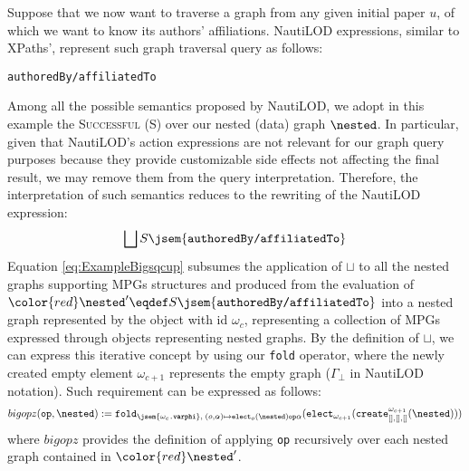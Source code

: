 \begin{example}
Suppose that we now want to traverse a graph from any given initial paper $u$, of which we want to know its authors' affiliations. NautiLOD expressions, similar to XPaths', represent such graph traversal query as follows:
\begin{center}
\texttt{authoredBy/affiliatedTo}
\end{center}
Among all the possible semantics proposed by NautiLOD, we adopt in this example the \textsc{Successful} (S) over our nested (data) graph $\nested$. In particular, given that NautiLOD's action expressions are not relevant for our graph query purposes because they provide customizable side effects not affecting the final result, we may remove them from the query interpretation. Therefore, the interpretation of such semantics reduces to the rewriting of the NautiLOD expression: \begin{equation}\label{eq:ExampleBigsqcup}
\bigsqcup S\jsem{\texttt{authoredBy/affiliatedTo}}
\end{equation}
Equation \ref{eq:ExampleBigsqcup} subsumes the application of $\sqcup$ to all the nested graphs supporting MPGs structures and produced from the evaluation of ${\color{red}\nested'\eqdef S\jsem{\texttt{authoredBy/affiliatedTo}}}$ into a nested graph represented by the object with id $\omega_c$, representing a collection of MPGs expressed through objects representing nested graphs. By the definition of $\sqcup$, we can express this iterative concept by using our \texttt{fold} operator, where the newly created empty element $\omega_{c+1}$ represents the empty graph ($\Gamma_\bot$ in NautiLOD notation). Such requirement can be expressed as follows:
\begin{equation}
bigopz(\texttt{op},\nested):=\texttt{fold}_{\jsem{\omega_c\texttt{.\textbf{varphi}}},\;(o,\alpha)\mapsto\texttt{elect}_o({\nested})\texttt{op}\alpha}(\texttt{elect}_{\omega_{c+1}}(\texttt{create}^{\omega_{c+1}}_{[],[],[]}({\nested})))
\end{equation}
where $bigopz$ provides the definition of applying \texttt{op} recursively over each nested graph contained in ${\color{red}\nested'}$.



\end{example}
